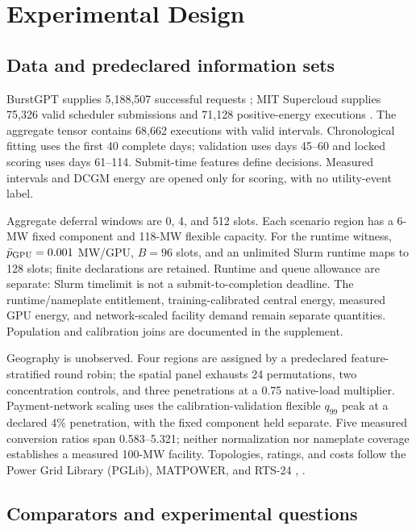 \documentclass[10pt,journal]{IEEEtran}
\begin{document}
\section{Experimental Design}\label{sec:design}

\subsection{Data and predeclared information sets}

BurstGPT supplies 5,188,507 successful requests
\cite{wang2024burstgpt}; MIT Supercloud supplies 75,326 valid scheduler
submissions and 71,128 positive-energy executions
\cite{samsi2021supercloud}. The aggregate tensor contains 68,662 executions
with valid intervals. Chronological fitting uses the first 40 complete days;
validation uses days 45--60 and locked scoring uses days 61--114. Submit-time
features define decisions. Measured intervals and DCGM energy are opened only
for scoring, with no utility-event label.

Aggregate deferral windows are 0, 4, and 512 slots. Each scenario region has a
6-MW fixed component and 118-MW flexible capacity. For the runtime witness,
$\bar p_{\rm GPU}=0.001$ MW/GPU, $B=96$ slots, and an unlimited Slurm
runtime maps to 128 slots; finite declarations are retained. Runtime and queue
allowance are separate: Slurm timelimit is not a submit-to-completion deadline.
The runtime/nameplate entitlement, training-calibrated central energy, measured
GPU energy, and network-scaled facility demand remain separate quantities.
Population and calibration joins are documented in the supplement.

Geography is unobserved. Four regions are assigned by a predeclared
feature-stratified round robin; the spatial panel exhausts 24 permutations,
two concentration controls, and three penetrations at a 0.75 native-load
multiplier. Payment-network scaling uses the calibration-validation flexible
$q_{99}$ peak at a declared 4\% penetration, with the fixed component held
separate. Five measured conversion ratios span 0.583--5.321; neither
normalization nor nameplate coverage establishes a measured 100-MW facility.
Topologies, ratings, and costs follow the Power Grid Library (PGLib), MATPOWER, and RTS-24
\cite{babaeinejadsarookolaee2021pglib,zimmerman2011matpower}, \cite{grigg1999rts}.

\subsection{Comparators and experimental questions}
\end{document}
